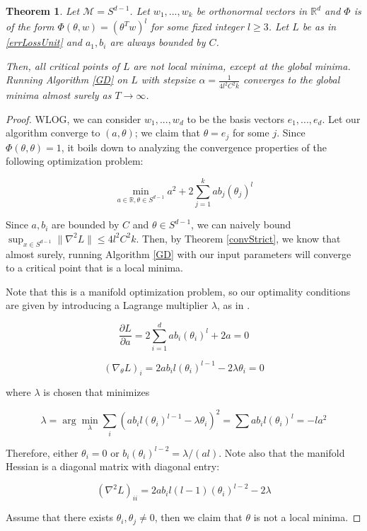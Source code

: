\documentclass[11pt]{article}
\newtheorem{theorem}{Theorem}[section]
\newcommand{\R}{{\mathbb{R}}}
\newcommand{\pd}[2]{\frac{\partial#1}{\partial#2}}
\begin{document}
\begin{theorem}
\label{PolyStrict}
Let $\mathcal{M} = S^{d-1}$. Let $w_1,...,w_k$ be orthonormal vectors in $\R^d$ and $\Phi$ is of the form $\Phi(\theta,w) = (\theta^Tw)^l$ for some fixed integer $l \geq 3$. Let $L$ be as in \eqref{errLossUnit} and $a_1, b_i$ are always bounded by $C$. 

Then, all critical points of $L$ are not local minima, except at the global minima. Running Algorithm \ref{GD} on $L$ with stepsize $\alpha = \frac{1}{4l^2C^2k}$ converges to the global minima almost surely as $T\to\infty$.
\end{theorem}

\begin{proof}
WLOG, we can consider $w_1,...,w_d$ to be the basis vectors $e_1,...,e_d$. Let our algorithm converge to $(a, \theta)$; we claim that $\theta = e_j$ for some $j$. Since $\Phi(\theta,\theta) = 1$, it boils down to analyzing the convergence properties of the following optimization problem:

\[\min_{a \in \R, \theta \in S^{d-1}}  a^2  + 2\sum_{j=1}^k ab_j (\theta_{j})^l\]


Since $a, b_i$ are bounded by $C$ and $\theta \in S^{d-1}$, we can naively bound $\sup_{x\in S^{d-1}}\|\nabla^2L\|\leq 4l^2C^2k$. Then, by Theorem \ref{convStrict}, we know that almost surely, running Algorithm \ref{GD} with our input parameters will converge to a critical point that is a local minima. 


Note that this is a manifold optimization problem, so our optimality conditions are given by introducing a Lagrange multiplier $\lambda$, as in \cite{GeHJY15}.


\[\pd{L}{a} = 2\sum_{i=1}^d ab_i (\theta_i)^l + 2a = 0\]

\[ (\nabla_\theta L)_i = 2ab_il(\theta_i)^{l-1}  -2\lambda \theta_i = 0 \]

where $\lambda$ is chosen that minimizes 

\[\lambda = \arg \min_\lambda \sum_i (ab_i l (\theta_i)^{l-1} - \lambda\theta_i)^2 = \sum ab_i l (\theta_i)^l = -la^2\]


Therefore, either $\theta_i = 0$ or $b_i (\theta_i)^{l-2} = \lambda/(al)$. Note also that the manifold Hessian is a diagonal matrix with diagonal entry: 

\[(\nabla^2 L)_{ii} = 2a b_i l(l-1)(\theta_i)^{l-2} - 2 \lambda\]

Assume that there exists $\theta_i, \theta_j \neq 0$, then we claim that $\theta$ is not a local minima.  


\end{proof}
\end{document}
